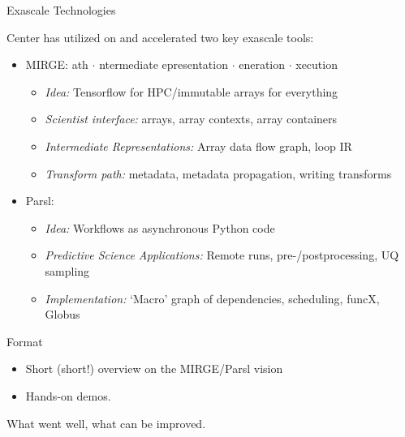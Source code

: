 \documentclass[aspectratio=169]{beamer}
\begin{document}
\begin{frame}{Exascale Technologies}
  \begin{center}
    \hspace{1cm}
    \hspace{1cm}
  \end{center}

  Center has utilized on and accelerated two key exascale tools:
\begin{itemize}
\item MIRGE:
    ath $\cdot$
    ntermediate epresentation $\cdot$
    eneration $\cdot$
    xecution
  \begin{itemize}
  \item \emph{Idea:} Tensorflow for HPC/immutable arrays for everything
  \item \emph{Scientist interface:} arrays, array contexts, array containers
  \item \emph{Intermediate Representations:} Array data flow graph, loop IR
  \item \emph{Transform path:} metadata, metadata propagation, writing transforms
  \end{itemize}
\item Parsl:
\begin{itemize}
\item \emph{Idea:} Workflows as asynchronous Python code
\item \emph{Predictive Science Applications:} Remote runs, pre-/postprocessing, UQ sampling
\item \emph{Implementation:} `Macro' graph of dependencies, scheduling, funcX, Globus
\end{itemize}
\end{itemize}
\end{frame}

\begin{frame}{Format}

  \begin{itemize}
    \item Short (short!) overview on the MIRGE/Parsl vision
    \item Hands-on demos.
  \end{itemize}

  \bigskip
    What went well, what can be improved.
\end{frame}


\end{document}
